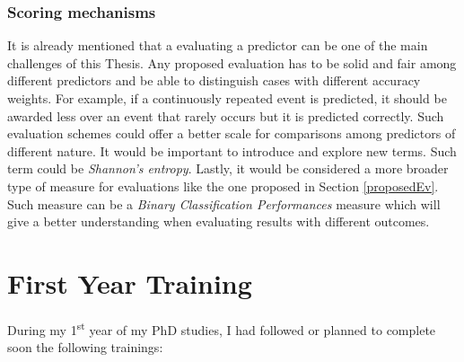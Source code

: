 \subsubsection{Scoring mechanisms}
It is already mentioned that a evaluating a predictor can be one of the main challenges of this Thesis. Any proposed evaluation has to be solid and fair among different predictors and be able to distinguish cases with different accuracy weights. For example, if a continuously repeated event is predicted, it should be awarded less over an event that rarely occurs but it is predicted correctly. Such evaluation schemes could offer a better scale for comparisons among predictors of different nature. It would be important to introduce and explore new terms. Such term could be \emph{Shannon's entropy}. Lastly, it would be considered a more broader type of measure for evaluations like the one proposed in Section \ref{proposedEv}. Such measure can be a \emph{Binary Classification Performances} measure \cite{2_kohl_2012} which will give a better understanding when evaluating results with different outcomes.

\newpage

\section{First Year Training}

During my 1\textsuperscript{st} year of my PhD studies, I had followed or planned to complete soon the following trainings:

